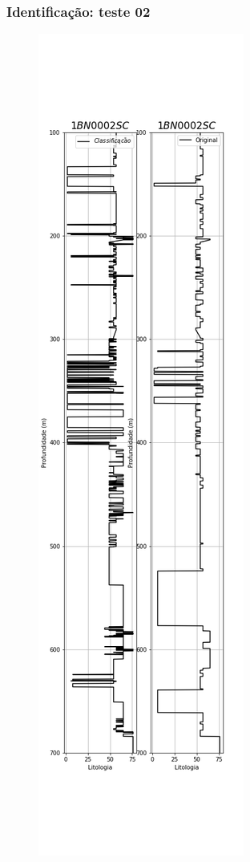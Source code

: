 \documentclass[aspectratio=10]{beamer} %
\begin{document}
\begin{frame}
	\frametitle{Identificação: teste 02}
	\begin{figure}[H]
		\centering
		\includegraphics[scale=0.18]{Imagens/result02.png}
		\label{IDt02}
	\end{figure} 
\end{frame}
\end{document}
